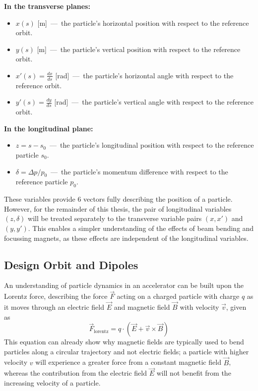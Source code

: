 \documentclass[a4paper,twoside,11pt]{report}
\begin{document}
\noindent \textbf{In the transverse planes:}
\begin{itemize}
  \item $x(s)$ [m]~---~the particle's horizontal position with respect to the reference orbit.
  \item $y(s)$ [m]~---~the particle's vertical position with respect to the reference orbit.
  \item $x'(s)=\frac{dx}{ds}$ [rad]~---~the particle's horizontal angle with respect to the reference orbit.
  \item $y'(s)=\frac{dy}{ds}$ [rad]~---~the particle's vertical angle with respect to the reference orbit.
\end{itemize}
\textbf{In the longitudinal plane:}
\begin{itemize}
    \item $z=s-s_0$~---~the particle's longitudinal position with respect to the reference particle $s_0$.
    \item $\delta = \Delta p/p_0$~---~the particle's momentum difference with respect to the reference particle $p_0$.
\end{itemize} 

These variables provide 6 vectors fully describing the position of a particle. However, for the remainder of this thesis, the pair of longitudinal variables $(z, \delta)$ will be treated separately to the transverse variable pairs $(x, x')$ and $(y, y')$. This enables a simpler understanding of the effects of beam bending and focussing magnets, as these effects are independent of the longitudinal variables.

\subsection{Design Orbit and Dipoles}

An understanding of particle dynamics in an accelerator can be built upon the Lorentz force, describing the force $\vec F$ acting on a charged particle with charge $q$ as it moves through an electric field $\vec E$ and magnetic field $\vec B$ with velocity $\vec v$, given as
\begin{equation}
\vec F_{\text{lorentz}} = q\cdot(\vec E+ \vec v\times\vec B)\label{eq:lorentz}
\end{equation}
This equation can already show why magnetic fields are typically used to bend particles along a circular trajectory and not electric fields; a particle with higher velocity $v$ will experience a greater force from a constant magnetic field $\vec B$, whereas the contribution from the electric field $\vec E$ will not benefit from the increasing velocity of a particle.
\end{document}

